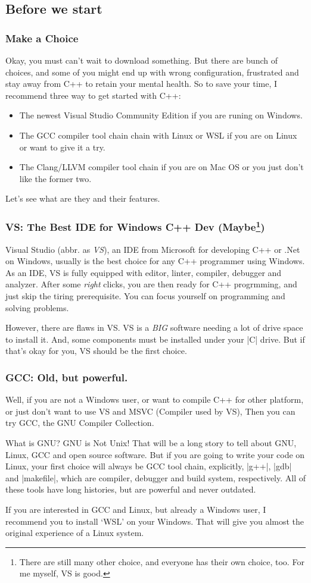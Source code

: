 \documentclass[compress,xcolor={dvipsnames}]{beamer}
\begin{document}
\subsection{Before we start}
\begin{frame}
    \frametitle{Make a Choice}
    Okay, you must can't wait to download something. But there are bunch of choices, and some of you might
    end up with wrong configuration, frustrated and stay away from C++ to retain your mental health. So to save your time,
    I recommend three way to get started with C++:
    \pause
    \begin{itemize}
        \item The newest Visual Studio Community Edition if you are runing on Windows.
        \item The GCC compiler tool chain chain with Linux or WSL if you are on Linux or want to give it a try.
        \item The Clang/LLVM compiler tool chain if you are on Mac OS or you just don't like the former two.
    \end{itemize}
    \pause
    Let's see what are they and their features.
\end{frame}
\begin{frame}[fragile]
    \frametitle{VS: The Best IDE for Windows C++ Dev (Maybe\footnote{There are still many other choice, and everyone has their own choice, too. For me myself, VS is good.})}
    Visual Studio (abbr. as \emph{VS}), an IDE from Microsoft for developing C++ or .Net on Windows, usually is the best choice for any C++ programmer
    using Windows. As an IDE, VS is fully equipped with editor, linter, compiler, debugger and analyzer. After some \emph{right} clicks, you are then ready for C++ progrmming, and just skip the tiring prerequisite. You can focus yourself on programming and solving problems.
    \pause

    However, there are flaws in VS. VS is a \emph{BIG} software needing a lot of drive space to install it. And, some components must be installed under your \cverb|C| drive. But if that's okay for you, VS should be the first choice.
\end{frame}

\begin{frame}[fragile]
    \frametitle{GCC: Old, but powerful.}
    Well, if you are not a Windows user, or want to compile C++ for other platform, or just don't want to use VS and MSVC (Compiler used by VS), Then you can try GCC, the GNU Compiler Collection.
    \pause

    What is GNU? GNU is Not Unix! That will be a long story to tell about GNU, Linux, GCC and open source software. But if you are going to write your code on Linux, your first choice will always be GCC tool chain, explicitly, \cverb|g++|, \cverb|gdb| and \cverb|makefile|, which are compiler, debugger and build system, respectively. All of these tools have long histories, but are powerful and never outdated.
    \pause

    If you are interested in GCC and Linux, but already a Windows user, I recommend you to install `WSL' on your Windows. That will give you almost the original experience of a Linux system.
\end{frame}
\end{document}
